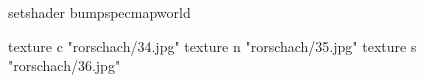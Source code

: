 setshader bumpspecmapworld

    texture c "rorschach/34.jpg"
    texture n "rorschach/35.jpg"
    texture s "rorschach/36.jpg"

